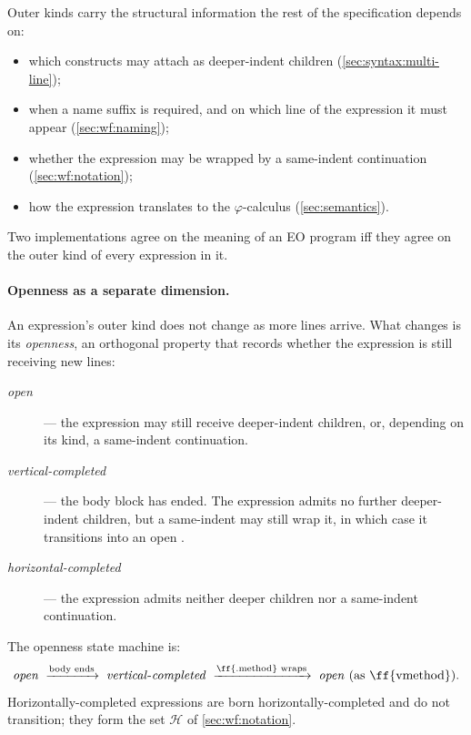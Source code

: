 Outer kinds carry the structural information the rest of the
  specification depends on:
\begin{itemize}
  \item which constructs may attach as deeper-indent children
    (\cref{sec:syntax:multi-line});
  \item when a name suffix is required, and on which line of the
    expression it must appear (\cref{sec:wf:naming});
  \item whether the expression may be wrapped by a same-indent
     continuation (\cref{sec:wf:notation});
  \item how the expression translates to the \(\varphi\)-calculus
    (\cref{sec:semantics}).
\end{itemize}
Two implementations agree on the meaning of an EO program iff they agree
  on the outer kind of every expression in it.

\paragraph{Openness as a separate dimension.}
An expression's outer kind does not change as more lines arrive.
What changes is its \emph{openness}, an orthogonal property that records
  whether the expression is still receiving new lines:
\begin{description}
  \item[\emph{open}] --- the expression may still receive deeper-indent
    children, or, depending on its kind, a same-indent 
    continuation.
  \item[\emph{vertical-completed}] --- the body block has ended.
    The expression admits no further deeper-indent children, but a
    same-indent  may still wrap it, in which case it
    transitions into an open .
  \item[\emph{horizontal-completed}] --- the expression admits neither
    deeper children nor a same-indent  continuation.
\end{description}
The openness state machine is:
\begin{equation*}
  \mathit{open}
    \;\xrightarrow{\text{body ends}}\;
  \mathit{vertical{\text -}completed}
    \;\xrightarrow{\text{\ff{.method} wraps}}\;
  \mathit{open}\ \text{(as \ff{vmethod})}.
\end{equation*}
Horizontally-completed expressions are born horizontally-completed and
  do not transition; they form the set \(\mathcal{H}\) of
  \cref{sec:wf:notation}.

